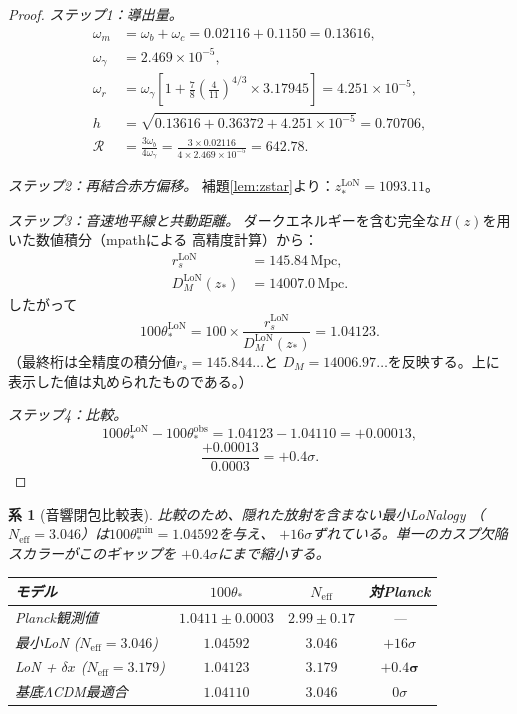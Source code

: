 \documentclass[12pt]{article}
\theoremstyle{plain}
\newtheorem{corollary}[theorem]{系}
\theoremstyle{definition}
\numberwithin{equation}{section}
\newcommand{\eff}{\mathrm{eff}}
\newcommand{\obs}{\mathrm{obs}}
\newcommand{\LoN}{\mathrm{LoN}}
\begin{document}
\begin{proof}
\emph{ステップ1：導出量。}
\begin{align}
\omega_m &= \omega_b+\omega_c = 0.02116+0.1150 = 0.13616,\\
\omega_\gamma &= 2.469\times10^{-5},\\
\omega_r &= \omega_\gamma\left[1+\frac{7}{8}\left(\frac{4}{11}\right)^{4/3}\times3.17945\right]
= 4.251\times10^{-5},\\
h &= \sqrt{0.13616+0.36372+4.251\times10^{-5}} = 0.70706,\\
\mathcal{R} &= \frac{3\omega_b}{4\omega_\gamma} = \frac{3\times0.02116}{4\times2.469\times10^{-5}} = 642.78.
\end{align}

\emph{ステップ2：再結合赤方偏移。}
補題\ref{lem:zstar}より：$z_*^{\LoN}=1093.11$。

\emph{ステップ3：音速地平線と共動距離。}
ダークエネルギーを含む完全な$H(z)$を用いた数値積分（mpathによる
高精度計算）から：
\begin{align}
r_s^{\LoN} &= 145.84\,\mathrm{Mpc},\\
D_M^{\LoN}(z_*) &= 14007.0\,\mathrm{Mpc}.
\end{align}
したがって
\begin{equation}
100\theta_*^{\LoN} = 100\times\frac{r_s^{\LoN}}{D_M^{\LoN}(z_*)} = 1.04123.
\end{equation}
（最終桁は全精度の積分値$r_s=145.844\ldots$と
$D_M=14006.97\ldots$を反映する。上に表示した値は丸められたものである。）

\emph{ステップ4：比較。}
\begin{equation}
100\theta_*^{\LoN}-100\theta_*^{\obs} = 1.04123-1.04110 = +0.00013,
\end{equation}
\begin{equation}
\frac{+0.00013}{0.0003} = +0.4\sigma.
\end{equation}
\end{proof}

\begin{corollary}[音響閉包比較表]\label{cor:table}
比較のため、隠れた放射を含まない最小LoNalogy
（$N_{\eff}=3.046$）は$100\theta_*^{\mathrm{min}}=1.04592$を与え、
$+16\sigma$ずれている。単一のカスプ欠陥スカラーがこのギャップを
$+0.4\sigma$にまで縮小する。
\begin{center}
\begin{tabular}{lccc}
\toprule
モデル & $100\theta_*$ & $N_{\eff}$ & 対Planck\\
\midrule
Planck観測値 & $1.0411\pm0.0003$ & $2.99\pm0.17$ & ---\\
最小LoN ($N_{\eff}=3.046$) & $1.04592$ & $3.046$ & $+16\sigma$\\
LoN + $\delta x$ ($N_{\eff}=3.179$) & $\mathbf{1.04123}$ & $3.179$ & $\mathbf{+0.4\sigma}$\\
基底$\Lambda$CDM最適合 & $1.04110$ & $3.046$ & $0\sigma$\\
\bottomrule
\end{tabular}
\end{center}
\end{corollary}
\end{document}
